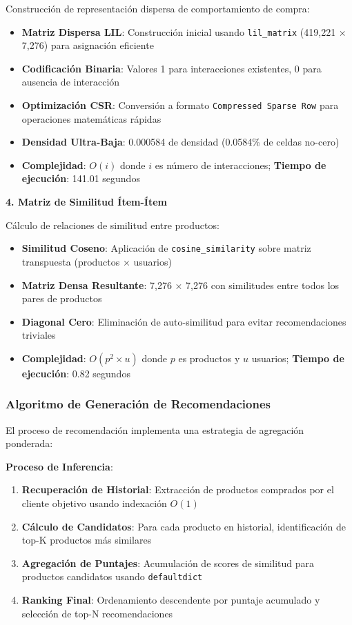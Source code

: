\documentclass[twocolumn]{article}
\begin{document}
Construcción de representación dispersa de comportamiento de compra:

\begin{itemize}
    \item \textbf{Matriz Dispersa LIL}: Construcción inicial usando \texttt{lil\_matrix} (419,221 × 7,276) para asignación eficiente
    \item \textbf{Codificación Binaria}: Valores 1 para interacciones existentes, 0 para ausencia de interacción
    \item \textbf{Optimización CSR}: Conversión a formato \texttt{Compressed Sparse Row} para operaciones matemáticas rápidas
    \item \textbf{Densidad Ultra-Baja}: 0.000584 de densidad (0.0584\% de celdas no-cero)
    \item \textbf{Complejidad}: \(O(i)\) donde \(i\) es número de interacciones; \textbf{Tiempo de ejecución}: 141.01 segundos
\end{itemize}

\textbf{4. Matriz de Similitud Ítem-Ítem}

Cálculo de relaciones de similitud entre productos:

\begin{itemize}
    \item \textbf{Similitud Coseno}: Aplicación de \texttt{cosine\_similarity} sobre matriz transpuesta (productos × usuarios)
    \item \textbf{Matriz Densa Resultante}: 7,276 × 7,276 con similitudes entre todos los pares de productos
    \item \textbf{Diagonal Cero}: Eliminación de auto-similitud para evitar recomendaciones triviales
    \item \textbf{Complejidad}: \(O(p^2 \times u)\) donde \(p\) es productos y \(u\) usuarios; \textbf{Tiempo de ejecución}: 0.82 segundos
\end{itemize}

\subsubsection{Algoritmo de Generación de Recomendaciones}

El proceso de recomendación implementa una estrategia de agregación ponderada:

\textbf{Proceso de Inferencia}:
\begin{enumerate}
    \item \textbf{Recuperación de Historial}: Extracción de productos comprados por el cliente objetivo usando indexación \(O(1)\)
    \item \textbf{Cálculo de Candidatos}: Para cada producto en historial, identificación de top-K productos más similares
    \item \textbf{Agregación de Puntajes}: Acumulación de scores de similitud para productos candidatos usando \texttt{defaultdict}
    \item \textbf{Ranking Final}: Ordenamiento descendente por puntaje acumulado y selección de top-N recomendaciones
\end{enumerate}
\end{document}
